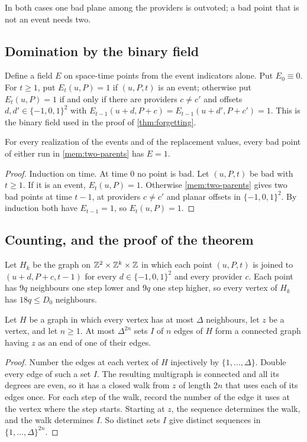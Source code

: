 In both cases one bad plane among the providers is outvoted; a bad point that is not an event needs two.

\subsection{Domination by the binary field}\label{mem:domination}

Define a field $E$ on space-time points from the event indicators alone. Put $E_0\equiv0$. For $t\ge1$, put $E_t(u,P)=1$ if $(u,P,t)$ is an event; otherwise put $E_t(u,P)=1$ if and only if there are providers $c\ne c'$ and offsets $d,d'\in\{-1,0,1\}^2$ with $E_{t-1}(u+d,P+c)=E_{t-1}(u+d',P+c')=1$. This is the binary field used in the proof of \cref{thm:forgetting}.

\begin{lemma}\label{mem:dominate}
For every realization of the events and of the replacement values, every bad point of either run in \cref{mem:two-parents} has $E=1$.
\end{lemma}

\begin{proof}
Induction on time. At time $0$ no point is bad. Let $(u,P,t)$ be bad with $t\ge1$. If it is an event, $E_t(u,P)=1$. Otherwise \cref{mem:two-parents} gives two bad points at time $t-1$, at providers $c\ne c'$ and planar offsets in $\{-1,0,1\}^2$. By induction both have $E_{t-1}=1$, so $E_t(u,P)=1$.
\end{proof}

\subsection{Counting, and the proof of the theorem}\label{mem:counting}

Let $H_k$ be the graph on $\mathbb{Z}^2\times\mathbb{Z}^k\times\mathbb{Z}$ in which each point $(u,P,t)$ is joined to $(u+d,P+c,t-1)$ for every $d\in\{-1,0,1\}^2$ and every provider $c$. Each point has $9q$ neighbours one step lower and $9q$ one step higher, so every vertex of $H_k$ has $18q\le D_0$ neighbours.

\begin{lemma}\label{mem:count}
Let $H$ be a graph in which every vertex has at most $\Delta$ neighbours, let $z$ be a vertex, and let $n\ge1$. At most $\Delta^{2n}$ sets $I$ of $n$ edges of $H$ form a connected graph having $z$ as an end of one of their edges.
\end{lemma}

\begin{proof}
Number the edges at each vertex of $H$ injectively by $\{1,\dots,\Delta\}$. Double every edge of such a set $I$. The resulting multigraph is connected and all its degrees are even, so it has a closed walk from $z$ of length $2n$ that uses each of its edges once. For each step of the walk, record the number of the edge it uses at the vertex where the step starts. Starting at $z$, the sequence determines the walk, and the walk determines $I$. So distinct sets $I$ give distinct sequences in $\{1,\dots,\Delta\}^{2n}$.
\end{proof}

